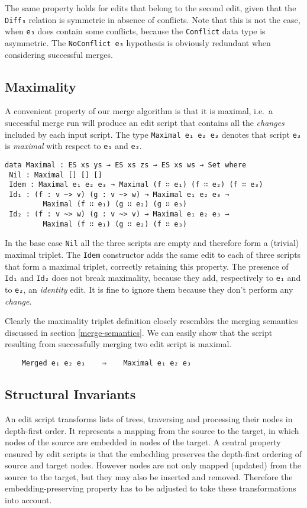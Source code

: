 \documentclass[preprint]{sigplanconf}
\begin{document}
    The same property holds for edits that belong to the second edit, given
    that the \texttt{Diff₃} relation is symmetric in absence of conflicts.	
    Note that this is not the case, when \texttt{e₃} does contain some conflicts,
    because the \texttt{Conflict} data type is asymmetric.
    The \texttt{NoConflict e₃} hypothesis is obviously redundant when
    considering successful merges.
    		
    \subsection{Maximality}
    A convenient property of our merge algorithm is that it is maximal, i.e.\ a successful 
    merge run will produce an edit script that contains all the \emph{changes} included
    by each input script. The type \texttt{Maximal e₁ e₂ e₃} denotes that  
    script \texttt{e₃} is \emph{maximal} with respect to \texttt{e₁} and \texttt{e₂}.
	
\begin{verbatim}
data Maximal : ES xs ys → ES xs zs → ES xs ws → Set where
 Nil : Maximal [] [] []
 Idem : Maximal e₁ e₂ e₃ → Maximal (f ∷ e₁) (f ∷ e₂) (f ∷ e₃)
 Id₁ : (f : v ~> v) (g : v ~> w) → Maximal e₁ e₂ e₃ → 
         Maximal (f ∷ e₁) (g ∷ e₂) (g ∷ e₃)
 Id₂ : (f : v ~> w) (g : v ~> v) → Maximal e₁ e₂ e₃ → 
         Maximal (f ∷ e₁) (g ∷ e₂) (f ∷ e₃)
\end{verbatim}

    In the base case \texttt{Nil} all the three scripts
    are empty and therefore form a (trivial) maximal triplet.
    The \texttt{Idem} constructor adds the same edit to each of three scripts 
    that form a maximal triplet, correctly retaining this property.
    The presence of \texttt{Id₁} and \texttt{Id₂} does not break maximality, because
    they add, respectively to \texttt{e₁} and to \texttt{e₂}, an \emph{identity} edit.
    It is fine to ignore them because they don't perform any \emph{change}.

    Clearly the maximality triplet definition closely resembles the merging semantics discussed
    in section \ref{merge-semantics}. We can easily show that the script resulting from
    successfully merging two edit script is maximal.
\begin{verbatim}
    Merged e₁ e₂ e₃    ⇒    Maximal e₁ e₂ e₃
\end{verbatim}

    \subsection{Structural  Invariants}
    An edit script transforms lists of trees, traversing and processing 
    their nodes in depth-first order.
    It represents a mapping from the source to the target, in which 
    nodes of the source are embedded in nodes of the target.
    A central property ensured by edit scripts is that the 
    embedding preserves the depth-first ordering of source and target nodes.
    However nodes are not only mapped (updated) from the source to the 
    target, but they may also be inserted and removed. 
    Therefore the embedding-preserving property has to be adjusted to
    take these transformations into account.
\end{document}
